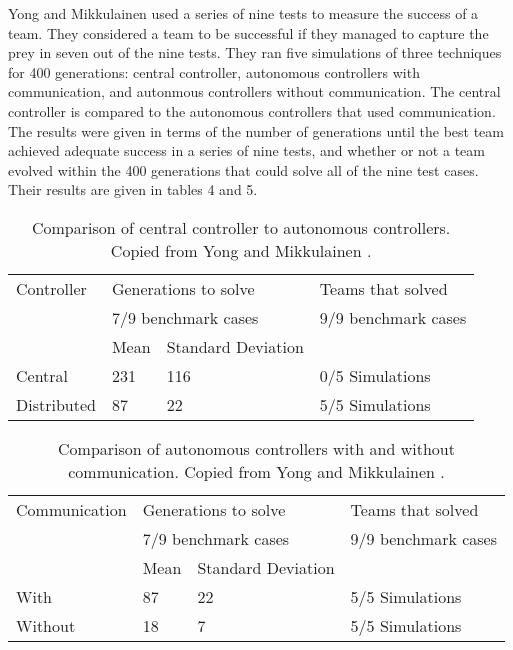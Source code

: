 \documentclass[12pt]{article} %
\begin{document}
Yong and Mikkulainen used a series of nine tests to measure the success of a team. They considered a team to be successful if they managed to capture the prey in seven out of the nine tests. They ran five simulations of three techniques for 400 generations: central controller, autonomous controllers with communication, and autonmous controllers without communication. The central controller is compared to the autonomous controllers that used communication. The results were given in terms of the number of generations until the best team achieved adequate success in a series of nine tests, and whether or not a team evolved within the 400 generations that could solve all of the nine test cases. Their results are given in tables 4 and 5.

\begin{table} \centering
    \begin{tabular}{|l|l|l|l|}
    \hline
    Controller & \multicolumn{2}{l|}{Generations to solve} & Teams that solved    \\
    ~             & \multicolumn{2}{l|}{7/9 benchmark cases} &  9/9 benchmark cases \\ \hline
    ~           & Mean                                            & Standard Deviation  & ~                                            \\ \hline
    Central     & 231                                             & 116 & 0/5 Simulations                              \\ \hline
    Distributed & 87                                              & 22  & 5/5 Simulations                              \\ \hline
    \end{tabular}
    \caption {Comparison of central controller to autonomous controllers. Copied from Yong and Mikkulainen \cite{Yong2001}.}
\end{table}

\begin{table} \centering
    \begin{tabular}{|l|l|l|l|}
    \hline
   Communication & \multicolumn{2}{l|}{Generations to solve} & Teams that solved    \\
    ~             & \multicolumn{2}{l|}{7/9 benchmark cases} &  9/9 benchmark cases \\ \hline
    ~             & Mean                                            & Standard Deviation & ~                                            \\ \hline
    With          & 87                                              & 22 & 5/5 Simulations                              \\ \hline
    Without       & 18                                              & 7  & 5/5 Simulations                              \\ \hline
    \end{tabular}
    \caption {Comparison of autonomous controllers with and without communication. Copied from Yong and Mikkulainen \cite{Yong2001}.}
\end{table}
\end{document}
